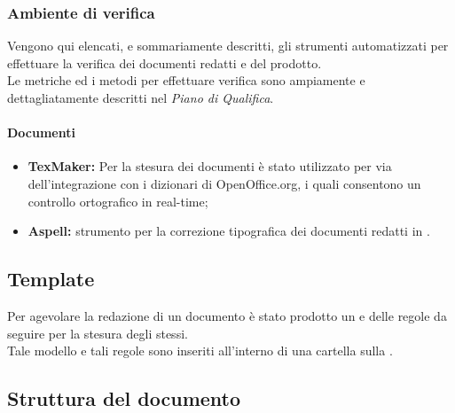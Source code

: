   \subsubsection{Ambiente di verifica}
    Vengono qui elencati, e sommariamente descritti, gli strumenti automatizzati per effettuare la verifica dei documenti redatti e del  prodotto.\\
    Le metriche ed i metodi per effettuare verifica sono ampiamente e dettagliatamente descritti nel \emph{Piano di Qualifica}.\\
    \paragraph{Documenti}
      \begin{itemize}
        \item \textbf{TexMaker: }Per la stesura dei documenti è stato utilizzato  per via dell'integrazione con i dizionari di OpenOffice.org, i quali consentono un controllo ortografico in real-time;
        \item \textbf{Aspell: }strumento per la correzione tipografica dei documenti redatti in \glossaryItem{\LaTeX}.
      \end{itemize}
  
  \subsection{Template}
    Per agevolare la redazione di un documento è stato prodotto un  e delle regole da seguire per la stesura degli stessi.\\
    Tale modello e tali regole sono inseriti all'interno di una cartella  sulla .
    \subsection{Struttura del documento}
